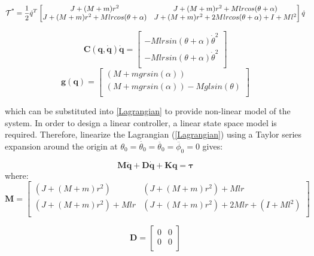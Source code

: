 \documentclass{UoNMCHA}
\numberwithin{equation}{section}
\begin{document}
\begin{equation}
\mathbf{\mathcal{T\textsuperscript{*}}} = \frac{1}{2}\dot{q}^{T}
\begin{bmatrix}
J+(M+m)r^2 & J+(M+m)r^2+Mlrcos(\theta+\alpha) \\
J+(M+m)r^2+Mlrcos(\theta+\alpha) & J+(M+m)r^2+2Mlrcos(\theta+\alpha)+I+Ml^2  \\
\end{bmatrix}\dot{q}
\end{equation}

\begin{equation}
\mathbf{C(q,\dot{q})\dot{q}} = 
\begin{bmatrix}
-Mlrsin(\theta+\alpha)\dot\theta^2\\
-Mlrsin(\theta+\alpha)\dot\theta^2\\
\end{bmatrix}
\end{equation}
\begin{equation}
\mathbf{g(q)} = 
\begin{bmatrix}
(M+mgrsin(\alpha))\\
(M+mgrsin(\alpha))-Mglsin(\theta)\\
\end{bmatrix}
\end{equation}

which can be substituted into \ref{Lagrangian} to provide non-linear model of the system.
In order to design a linear controller, a linear state space model is required. Therefore, linearize the Lagrangian (\ref{Lagrangian}) using a Taylor series expansion around the origin at $ \theta_0=\dot{\theta_0}=\ddot{\theta_0}=\ddot{\phi_0}=0$ gives:

\begin{equation}\label{2.5}
\mathbf{M\ddot{q} + D\dot{q} + Kq = \tau}  
\end{equation}
where: 
\begin{equation}
\mathbf{M} = 
\begin{bmatrix}
(J+(M+m)r^2) & (J+(M+m)r^2)+Mlr\\
(J+(M+m)r^2)+Mlr & (J+(M+m)r^2)+2Mlr+(I+Ml^2)  \\
\end{bmatrix}
\end{equation}

\begin{equation}
\mathbf{D} = 
\begin{bmatrix}
0 & 0\\
0 & 0 \\
\end{bmatrix}
\end{equation}
\end{document}

